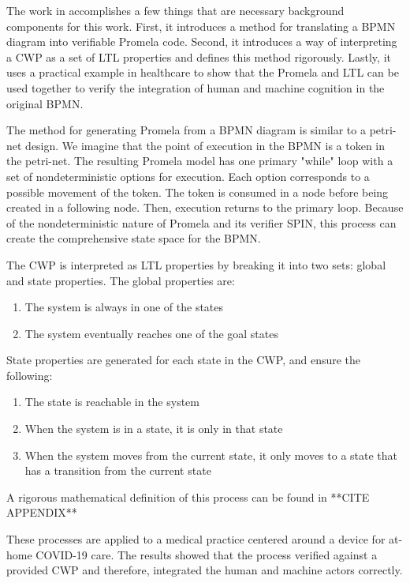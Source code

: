 The work in \cite{mercer22} accomplishes a few things that are necessary background components for this work. First, it introduces a method for translating a BPMN diagram into verifiable Promela code. Second, it introduces a way of interpreting a CWP as a set of LTL properties and defines this method rigorously. Lastly, it uses a practical example in healthcare to show that the Promela and LTL can be used together to verify the integration of human and machine cognition in the original BPMN.

The method for generating Promela from a BPMN diagram is similar to a petri-net design. We imagine that the point of execution in the BPMN is a token in the petri-net. The resulting Promela model has one primary "while" loop with a set of nondeterministic options for execution. Each option corresponds to a possible movement of the token. The token is consumed in a node before being created in a following node. Then, execution returns to the primary loop. Because of the nondeterministic nature of Promela and its verifier SPIN, this process can create the comprehensive state space for the BPMN.

The CWP is interpreted as LTL properties by breaking it into two sets: global and state properties. The global properties are:
\begin{enumerate}
    \item The system is always in one of the states
    \item The system eventually reaches one of the goal states
\end{enumerate}

State properties are generated for each state in the CWP, and ensure the following:
\begin{enumerate}
    \item The state is reachable in the system
    \item When the system is in a state, it is only in that state
    \item When the system moves from the current state, it only moves to a state that has a transition from the current state
\end{enumerate}

A rigorous mathematical definition of this process can be found in **CITE APPENDIX**

These processes are applied to a medical practice centered around a device for at-home COVID-19 care. The results showed that the process verified against a provided CWP and therefore, integrated the human and machine actors correctly.